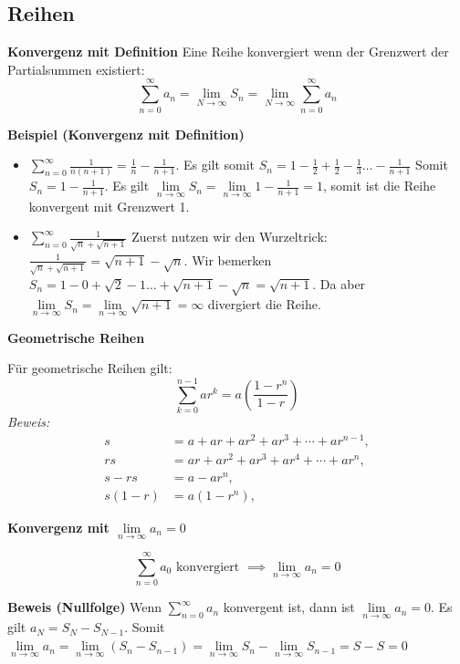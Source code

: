\documentclass[25pt]{sciposter}
\newcommand{\limm}{\lim\limits_{n \to \infty}}
\newenvironment{method}[1]{\begin{mdframed}[backgroundcolor=blue!10,innertopmargin=15pt, innerbottommargin=15pt, nobreak=true]
		\textbf{#1 }
	}
	{ 
	\end{mdframed}
}
\begin{document}
\begin{multicols}{3}

\section{Reihen}

\begin{method}{Konvergenz mit Definition} Eine Reihe konvergiert wenn der Grenzwert der Partialsummen existiert:
	$$\sum_{n=0}^{\infty} a_n  = \lim\limits_{N\to\infty} S_n = \lim\limits_{N\to\infty} \sum_{n=0}^{\infty} a_n$$
\end{method}

\textbf{Beispiel (Konvergenz mit Definition)}
\begin{itemize}
	\item $\sum_{n = 0}^{\infty} \frac{1}{n(n+1)} = \frac{1}{n} - \frac{1}{n+1}$. Es gilt somit $S_n = 1 - \frac{1}{2} + \frac{1}{2} - \frac{1}{3} \ldots - \frac{1}{n+1}$ Somit $S_n = 1-\frac{1}{n+1}$. Es gilt $\limm S_n = \limm 1 - \frac{1}{n+1} = 1$, somit ist die Reihe konvergent mit Grenzwert 1.
	\item $\sum_{n = 0}^{\infty} \frac{1}{\sqrt{n} + \sqrt{n+1}} $ Zuerst nutzen wir den Wurzeltrick: $\frac{1}{\sqrt{n} + \sqrt{n+1}} = \sqrt{n+1} - \sqrt{n}$. Wir bemerken $S_n = 1 - 0 + \sqrt{2} - 1 \ldots + \sqrt{n+1} - \sqrt{n} = \sqrt{n+1}$. Da aber $\limm S_n =  \limm \sqrt{n+1} = \infty$ divergiert die Reihe.
\end{itemize}

\begin{method}{Geometrische Reihen}
	Für geometrische Reihen gilt:
	$$\sum _{k=0}^{n-1}ar^{k}=a\left({\frac {1-r^{n}}{1-r}}\right)$$
	\textit{Beweis:}{\begin{align*}s&=a+ar+ar^{2}+ar^{3}+\cdots +ar^{n-1},\\rs&=ar+ar^{2}+ar^{3}+ar^{4}+\cdots +ar^{n},\\s-rs&=a-ar^{n},\\s(1-r)&=a(1-r^{n}),\end{align*}}
\end{method}

\begin{method}{Konvergenz mit $\lim\limits_{n \to \infty } a_n = 0$}
$$\sum_{n=0}^{\infty} a_0 \text{ konvergiert } \implies \lim\limits_{n \to \infty } a_n = 0 $$
\end{method}

\textbf{Beweis (Nullfolge)} Wenn $\sum_{n = 0}^{\infty} a_n$ konvergent ist, dann ist $\limm a_n = 0$.
Es gilt $a_N = S_N - S_{N-1}$. Somit $\limm a_n = \limm (S_n - S_{n-1}) = \limm S_n - \limm S_{n-1} = S-S = 0$


\end{multicols}
\end{document}
